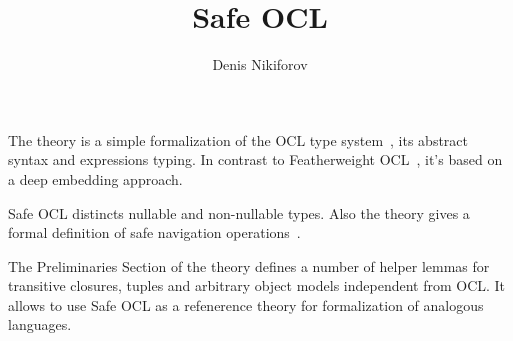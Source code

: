 \documentclass[11pt,a4paper]{book}
\makeatletter
\newenvironment{abstract}{%
  \small
  \begin{center}%
    {\bfseries \abstractname\vspace{-.5em}\vspace{\z@}}%
  \end{center}%
  \quotation}{\endquotation}
\makeatother
\begin{document}
\title{Safe OCL}
\author{Denis Nikiforov}
\maketitle

\begin{abstract}
  The theory is a simple formalization of the OCL type system~\cite{OCL24},
  its abstract syntax and expressions typing.
  In contrast to Featherweight OCL~\cite{Featherweight_OCL-AFP},
  it's based on a deep embedding approach.

  Safe OCL distincts nullable and non-nullable types. Also
  the theory gives a formal definition of safe navigation
  operations~\cite{DBLP:conf/models/Willink15}.

  The Preliminaries Section of the theory defines a number of
  helper lemmas for transitive closures, tuples and arbitrary
  object models independent from OCL. It allows to use
  Safe OCL as a refenerence theory for formalization of
  analogous languages.
\end{abstract}

\tableofcontents





\end{document}
